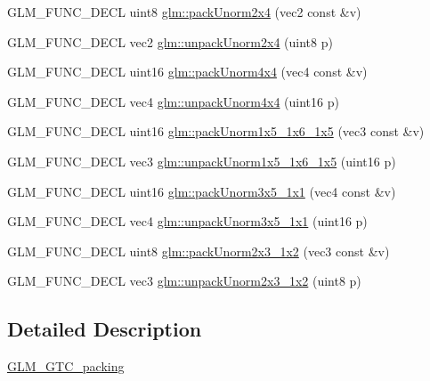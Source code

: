 \begin{DoxyCompactItemize}
\item 
G\+L\+M\+\_\+\+F\+U\+N\+C\+\_\+\+D\+E\+CL uint8 \hyperlink{group__gtc__packing_gad68eb2f848ba867192b8787998c0595a}{glm\+::pack\+Unorm2x4} (vec2 const \&v)
\item 
G\+L\+M\+\_\+\+F\+U\+N\+C\+\_\+\+D\+E\+CL vec2 \hyperlink{group__gtc__packing_ga3afb0452954320f2d83fe6f38cb24147}{glm\+::unpack\+Unorm2x4} (uint8 p)
\item 
G\+L\+M\+\_\+\+F\+U\+N\+C\+\_\+\+D\+E\+CL uint16 \hyperlink{group__gtc__packing_gad493c9f130e91dd8a4b360b05dcea573}{glm\+::pack\+Unorm4x4} (vec4 const \&v)
\item 
G\+L\+M\+\_\+\+F\+U\+N\+C\+\_\+\+D\+E\+CL vec4 \hyperlink{group__gtc__packing_ga38a0a518d53e15a9481c31dc1e574a40}{glm\+::unpack\+Unorm4x4} (uint16 p)
\item 
G\+L\+M\+\_\+\+F\+U\+N\+C\+\_\+\+D\+E\+CL uint16 \hyperlink{group__gtc__packing_ga0fcb493167d540aca105d11df5c55503}{glm\+::pack\+Unorm1x5\+\_\+1x6\+\_\+1x5} (vec3 const \&v)
\item 
G\+L\+M\+\_\+\+F\+U\+N\+C\+\_\+\+D\+E\+CL vec3 \hyperlink{group__gtc__packing_ga6804d0525daf68bcac226f46fbb3b24e}{glm\+::unpack\+Unorm1x5\+\_\+1x6\+\_\+1x5} (uint16 p)
\item 
G\+L\+M\+\_\+\+F\+U\+N\+C\+\_\+\+D\+E\+CL uint16 \hyperlink{group__gtc__packing_ga1b41375846ed66768da78ca299d8d010}{glm\+::pack\+Unorm3x5\+\_\+1x1} (vec4 const \&v)
\item 
G\+L\+M\+\_\+\+F\+U\+N\+C\+\_\+\+D\+E\+CL vec4 \hyperlink{group__gtc__packing_gaab3b476e8f320670717fd518f350ce28}{glm\+::unpack\+Unorm3x5\+\_\+1x1} (uint16 p)
\item 
G\+L\+M\+\_\+\+F\+U\+N\+C\+\_\+\+D\+E\+CL uint8 \hyperlink{group__gtc__packing_ga0acca4eb99c300fe2edeef7ebd8fa08b}{glm\+::pack\+Unorm2x3\+\_\+1x2} (vec3 const \&v)
\item 
G\+L\+M\+\_\+\+F\+U\+N\+C\+\_\+\+D\+E\+CL vec3 \hyperlink{group__gtc__packing_gaeeacc5275329100c50fe8fc0871eb423}{glm\+::unpack\+Unorm2x3\+\_\+1x2} (uint8 p)
\end{DoxyCompactItemize}


\subsection{Detailed Description}
\hyperlink{group__gtc__packing}{G\+L\+M\+\_\+\+G\+T\+C\+\_\+packing} 
